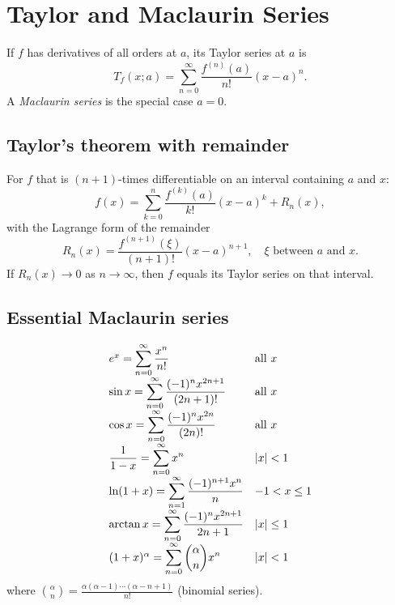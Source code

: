 \section{Taylor and Maclaurin Series}

\begin{definition}
If $f$ has derivatives of all orders at $a$, its Taylor series at $a$ is
\[ T_f(x; a) = \sum_{n=0}^\infty \frac{f^{(n)}(a)}{n!} (x - a)^n. \]
A \emph{Maclaurin series} is the special case $a = 0$.
\end{definition}

\subsection{Taylor's theorem with remainder}
For $f$ that is $(n+1)$-times differentiable on an interval containing $a$ and $x$:
\[
f(x) = \sum_{k=0}^n \frac{f^{(k)}(a)}{k!} (x - a)^k + R_n(x),
\]
with the Lagrange form of the remainder
\[ R_n(x) = \frac{f^{(n+1)}(\xi)}{(n+1)!} (x - a)^{n+1}, \quad \xi \text{ between } a \text{ and } x. \]
If $R_n(x) \to 0$ as $n \to \infty$, then $f$ equals its Taylor series on that interval.

\subsection{Essential Maclaurin series}
\begin{keybox}
\[
\renewcommand{\arraystretch}{1.6}
\begin{array}{l l l}
e^x = \displaystyle\sum_{n=0}^\infty \dfrac{x^n}{n!} & \text{all } x \\
\sin x = \displaystyle\sum_{n=0}^\infty \dfrac{(-1)^n x^{2n+1}}{(2n+1)!} & \text{all } x \\
\cos x = \displaystyle\sum_{n=0}^\infty \dfrac{(-1)^n x^{2n}}{(2n)!} & \text{all } x \\
\dfrac{1}{1 - x} = \displaystyle\sum_{n=0}^\infty x^n & |x| < 1 \\
\ln(1 + x) = \displaystyle\sum_{n=1}^\infty \dfrac{(-1)^{n+1} x^n}{n} & -1 < x \le 1 \\
\arctan x = \displaystyle\sum_{n=0}^\infty \dfrac{(-1)^n x^{2n+1}}{2n+1} & |x| \le 1 \\
(1 + x)^\alpha = \displaystyle\sum_{n=0}^\infty \binom{\alpha}{n} x^n & |x| < 1
\end{array}
\]
where $\binom{\alpha}{n} = \tfrac{\alpha (\alpha - 1)\cdots(\alpha - n + 1)}{n!}$ (binomial series).
\end{keybox}

